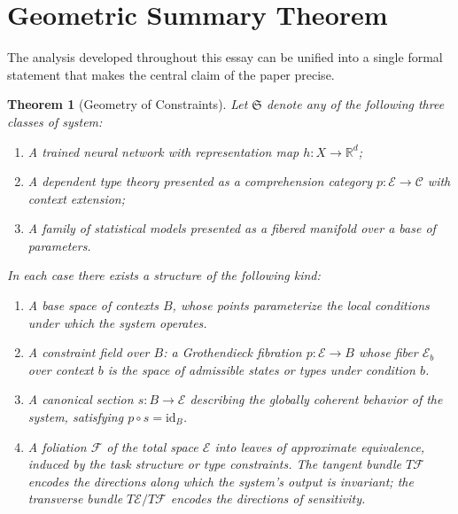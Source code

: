 \documentclass[12pt,a4paper]{article}
\theoremstyle{plain}
\newtheorem{theorem}{Theorem}[section]
\theoremstyle{definition}
\newcommand{\E}{\mathcal{E}}
\newcommand{\C}{\mathcal{C}}
\begin{document}
\section{Geometric Summary Theorem}
\label{sec:summary}

The analysis developed throughout this essay can be unified into a single formal
statement that makes the central claim of the paper precise.

\begin{theorem}[Geometry of Constraints]
\label{thm:main}
Let $\mathfrak{S}$ denote any of the following three classes of system:
\begin{enumerate}[label=\emph{(\roman*)}]
\item A trained neural network with representation map $h : X \to \mathbb{R}^d$;
\item A dependent type theory presented as a comprehension category
      $p : \E \to \C$ with context extension;
\item A family of statistical models presented as a fibered manifold over a
      base of parameters.
\end{enumerate}
In each case there exists a structure of the following kind:
\begin{enumerate}[label=\emph{(\alph*)}]
\item A \emph{base space of contexts} $B$, whose points parameterize the
      local conditions under which the system operates.

\item A \emph{constraint field} over $B$: a Grothendieck fibration
      $p : \E \to B$ whose fiber $\E_b$ over context $b$ is the space of
      admissible states or types under condition $b$.

\item A \emph{canonical section} $s : B \to \E$ describing the globally
      coherent behavior of the system, satisfying $p \circ s = \mathrm{id}_B$.

\item A \emph{foliation} $\mathcal{F}$ of the total space $\E$ into leaves
      of approximate equivalence, induced by the task structure or type
      constraints. The tangent bundle $T\mathcal{F}$ encodes the directions
      along which the system's output is invariant; the transverse bundle
      $T\E / T\mathcal{F}$ encodes the directions of sensitivity.


\end{enumerate}
\end{theorem}
\end{document}
